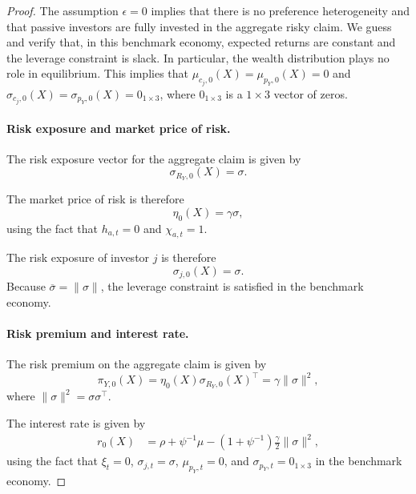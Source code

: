 \begin{proof}
The assumption $\epsilon = 0$ implies that there is no preference heterogeneity and that passive investors are fully invested in the aggregate risky claim.
We guess and verify that, in this benchmark economy, expected returns are constant and the leverage constraint is slack.
In particular, the wealth distribution plays no role in equilibrium.
This implies that $\mu_{c_j,0}(X) = \mu_{p_Y,0}(X) = 0$ and $\sigma_{c_j,0}(X) = \sigma_{p_Y,0}(X) = 0_{1\times 3}$, where $0_{1\times 3}$ is a $1\times 3$ vector of zeros.

\paragraph{Risk exposure and market price of risk.}
The risk exposure vector for the aggregate claim is given by
\begin{equation}
    \sigma_{R_Y,0}(X) = \sigma.
\end{equation}
 
The market price of risk is therefore
\begin{equation}
    \eta_0(X) = \gamma \sigma,
\end{equation}
using the fact that $h_{a,t} = 0$ and $\chi_{a,t} = 1$.

The risk exposure of investor $j$ is therefore
\begin{equation}
    \sigma_{j,0}(X) = \sigma.
\end{equation}
Because $\overline{\sigma} = \|\sigma\|$, the leverage constraint is satisfied in the benchmark economy.

\paragraph{Risk premium and interest rate.}
The risk premium on the aggregate claim is given by
\begin{equation}
    \pi_{Y,0}(X) = \eta_0(X) \sigma_{R_Y,0}(X)^\top = \gamma \|\sigma\|^2,
\end{equation}
where $\|\sigma\|^2 = \sigma \sigma^\top$.

The interest rate is given by
\begin{align}
    r_0(X) &= \rho 
    + \psi^{-1} \mu 
    -(1+\psi^{-1}) 
        \frac{\gamma }{2} \|\sigma\|^2,
\end{align}
using the fact that $\xi_t = 0$, $\sigma_{j,t} = \sigma$, $\mu_{p_Y,t} = 0$, and $\sigma_{p_Y,t} = 0_{1\times 3}$ in the benchmark economy.


\end{proof}
